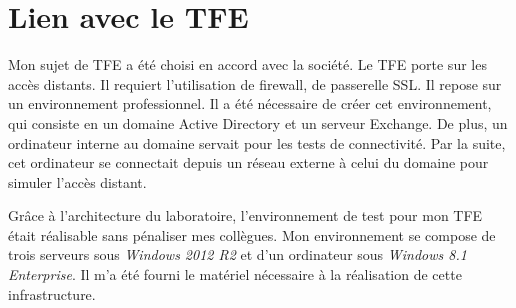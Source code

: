 \section{Lien avec le TFE}
Mon sujet de TFE a été choisi en accord avec la société.
Le TFE porte sur les accès distants.
Il requiert l'utilisation de firewall, de passerelle SSL.
Il repose sur un environnement professionnel.
Il a été nécessaire de créer cet environnement, qui consiste en un domaine Active Directory et un serveur Exchange. 
De plus, un ordinateur interne au domaine servait pour les tests de connectivité.
Par la suite, cet ordinateur se connectait depuis un réseau externe à celui du domaine pour simuler l'accès distant.

Grâce à l'architecture du laboratoire, l'environnement de test pour mon TFE était réalisable sans pénaliser mes collègues.
Mon environnement se compose de trois serveurs sous \textit{Windows 2012 R2} et d'un ordinateur sous \textit{Windows 8.1 Enterprise}.
Il m'a été fourni le matériel nécessaire à la réalisation de cette infrastructure.
 

